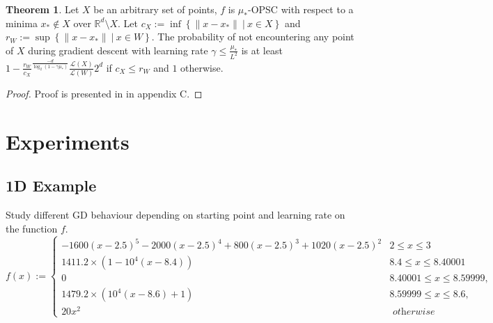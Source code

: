 \documentclass{article}
\theoremstyle{definition}
\newtheorem{theorem}{Theorem}[section]
\newtheorem{proposition}[theorem]{Proposition}
\begin{document}
\begin{theorem}\label{thm2}
    Let $X$ be an arbitrary set of points, 
    $f$ is $\mu_\ast$-OPSC with respect to a minima 
    $x_\ast \notin X$ over $\mathbb{R}^d \setminus X$.
    Let $c_X := \inf \left\{ \| x - x_\ast \| \:|\: x \in X  \right\}$
    and $r_W := \sup \left\{ \| x - x_\ast \| \:|\: x \in W \right\}$.
    The probability of not encountering any point of $X$ during 
    gradient descent with learning rate $\gamma \leq \frac{\mu_\ast}{L^2}$
    is at least $1 - \frac{r_W}{c_X}^{\frac{-d}{\log_2(1 - \gamma \mu_\ast)}} \frac{\mathcal{L}(X)}{\mathcal{L}(W)} 2^d$
    if $c_X \leq r_W$ and $1$ otherwise.
\end{theorem}

\begin{proof}
    Proof is presented in \cite{mohtashami2023special} in appendix C.
\end{proof}



    

\clearpage 

\section{Experiments}
\subsection*{1D Example}
Study different GD behaviour depending on starting point and learning rate 
on the function $f$. 
$$
f(x):= \begin{cases}
    -1600(x-2.5)^5-2000(x-2.5)^4+800(x-2.5)^3+1020(x-2.5)^2 & 2 \leq x \leq 3 \\ 
    1411.2 \times\left(1-10^4(x-8.4)\right) & 8.4 \leq x \leq 8.40001 \\ 
    0 & 8.40001 \leq x \leq 8.59999, \\ 
    1479.2 \times\left(10^4(x-8.6)+1\right) & 8.59999 \leq x \leq 8.6, \\ 
    20 x^2 & \textit{ otherwise }
\end{cases}
$$
\end{document}
